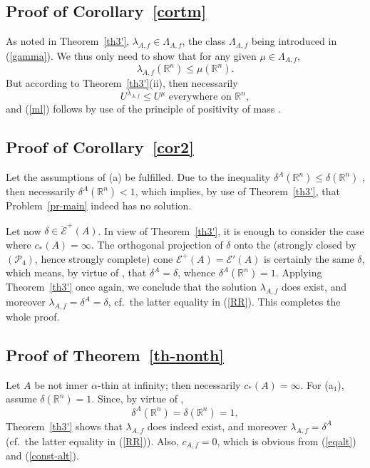 \documentclass[12pt,a4paper,reqno]{amsart} %
\theoremstyle{lause}
\theoremstyle{maaritelma}
\theoremstyle{lause}
\theoremstyle{maaritelma}
\numberwithin{equation}{section}
\begin{document}
\subsection{Proof of Corollary~\ref{cortm}}\label{sec-exc} As noted in Theorem~\ref{th3'}, $\lambda_{A,f}\in\Lambda_{A,f}$,  the class $\Lambda_{A,f}$ being introduced in (\ref{gamma}). We thus only need to show that for any given $\mu\in\Lambda_{A,f}$,
 \begin{equation}\label{ml}
 \lambda_{A,f}(\mathbb R^n)\leqslant\mu(\mathbb R^n).
 \end{equation}
But according to Theorem~\ref{th3'}(ii), then necessarily
\[U^{\lambda_{A,f}}\leqslant U^\mu\text{ \ everywhere on $\mathbb R^n$},\]
and (\ref{ml}) follows by use of
the principle of positivity of mass \cite[Theorem~3.11]{FZ}.

\subsection{Proof of Corollary~\ref{cor2}}\label{sec-pr5} Let the assumptions of (a) be fulfilled. Due to the inequality $\delta^A(\mathbb R^n)\leqslant\delta(\mathbb R^n)$ \cite[Corollary~4.9]{Z-bal}, then necessarily
$\delta^A(\mathbb R^n)<1$, which implies, by use of Theorem~\ref{th3'}, that Problem~\ref{pr-main} indeed has no solution.

Let now $\delta\in\breve{\mathcal E}^+(A)$. In view of Theorem~\ref{th3'}, it is enough to consider the case where $c_*(A)=\infty$. The orthogonal projection of $\delta$ onto the (strongly closed by $(\mathcal P_4)$, hence strongly complete) cone $\mathcal E^+(A)=\mathcal E'(A)$ is certainly the same $\delta$, which means, by virtue of \cite[Theorem~3.1(b)]{Z-arx-22}, that
$\delta^A=\delta$,
whence $\delta^A(\mathbb R^n)=1$. Applying Theorem~\ref{th3'} once again, we conclude that the solution $\lambda_{A,f}$ does exist, and moreover $\lambda_{A,f}=\delta^A=\delta$, cf.\ the latter equality in (\ref{RR}). This completes the whole proof.

\subsection{Proof of Theorem~\ref{th-nonth}}\label{sec-pr6} Let $A$ be not inner $\alpha$-thin at infinity; then necessarily $c_*(A)=\infty$.
For (a$_1$), assume $\delta(\mathbb R^n)=1$. Since, by virtue of \cite[Corollary~5.3]{Z-bal2},
\[\delta^A(\mathbb R^n)=\delta(\mathbb R^n)=1,\]
Theorem~\ref{th3'} shows that $\lambda_{A,f}$ does indeed exist, and moreover $\lambda_{A,f}=\delta^A$ (cf.\ the latter equality in (\ref{RR})). Also, $c_{A,f}=0$, which is obvious from (\ref{eqalt}) and (\ref{const-alt}).
\end{document}
